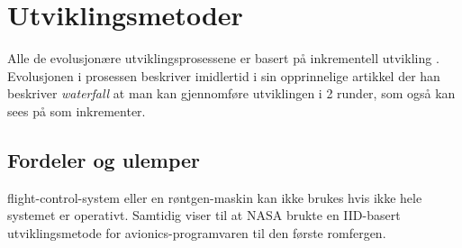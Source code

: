 \section{Utviklingsmetoder}
Alle de evolusjonære utviklingsprosessene er basert på inkrementell utvikling \cite{larman2003iterative}. Evolusjonen i prosessen 
\textcite{royce1970software} beskriver imidlertid i sin opprinnelige artikkel der han beskriver \textit{waterfall} at man kan 
gjennomføre utviklingen i 2 runder, som også kan sees på som inkrementer.

\subsection{Fordeler og ulemper}
flight-control-system eller en røntgen-maskin kan ikke brukes hvis ikke hele systemet er operativt. Samtidig viser
\textcite{larman2003iterative} til at NASA brukte en IID-basert utviklingsmetode for avionics-programvaren til den første romfergen.

